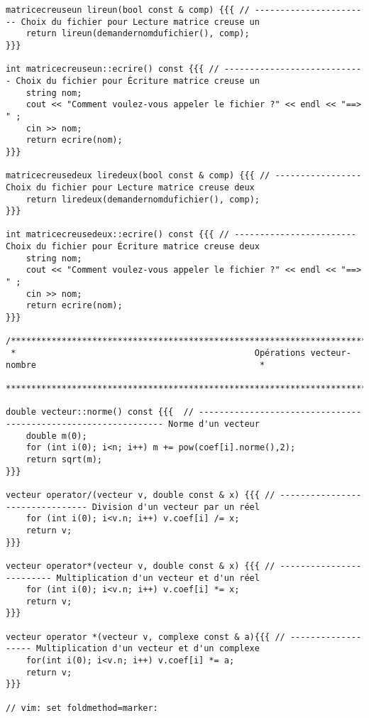 \documentclass[a4paper]{article}
\begin{document}
\begin{verbatim}
matricecreuseun lireun(bool const & comp) {{{ // ----------------------- Choix du fichier pour Lecture matrice creuse un
    return lireun(demandernomdufichier(), comp);
}}}

int matricecreuseun::ecrire() const {{{ // ---------------------------- Choix du fichier pour Écriture matrice creuse un
    string nom;
    cout << "Comment voulez-vous appeler le fichier ?" << endl << "==> " ;
    cin >> nom;
    return ecrire(nom);
}}}

matricecreusedeux liredeux(bool const & comp) {{{ // ----------------- Choix du fichier pour Lecture matrice creuse deux
    return liredeux(demandernomdufichier(), comp);
}}}

int matricecreusedeux::ecrire() const {{{ // ------------------------ Choix du fichier pour Écriture matrice creuse deux
    string nom;
    cout << "Comment voulez-vous appeler le fichier ?" << endl << "==> " ;
    cin >> nom;
    return ecrire(nom);
}}}

/**********************************************************************************************************************
 *                                               Opérations vecteur-nombre                                            *
 **********************************************************************************************************************/

double vecteur::norme() const {{{  // --------------------------------------------------------------- Norme d'un vecteur
    double m(0);
	for (int i(0); i<n; i++) m += pow(coef[i].norme(),2);
    return sqrt(m);
}}}

vecteur operator/(vecteur v, double const & x) {{{ // -------------------------------- Division d'un vecteur par un réel
	for (int i(0); i<v.n; i++) v.coef[i] /= x;
    return v;
}}}

vecteur operator*(vecteur v, double const & x) {{{ // ------------------------- Multiplication d'un vecteur et d'un réel
	for (int i(0); i<v.n; i++) v.coef[i] *= x;
    return v;
}}}

vecteur operator *(vecteur v, complexe const & a){{{ // ------------------- Multiplication d'un vecteur et d'un complexe
    for(int i(0); i<v.n; i++) v.coef[i] *= a;
    return v;
}}}

// vim: set foldmethod=marker:
\end{verbatim}
\end{document}

